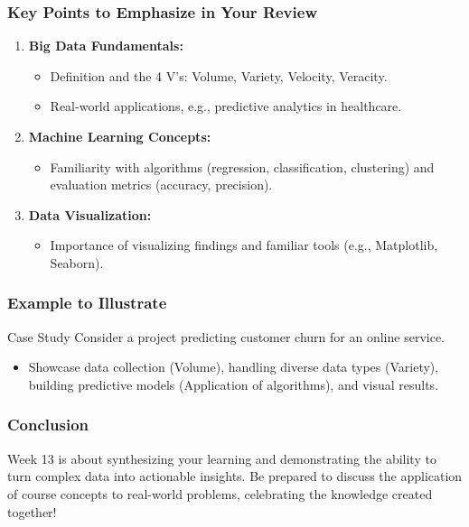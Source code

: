 \documentclass[aspectratio=169]{beamer}
\begin{document}
\begin{frame}[fragile]
    \frametitle{Key Points to Emphasize in Your Review}
    \begin{enumerate}
        \item \textbf{Big Data Fundamentals:}
            \begin{itemize}
                \item Definition and the 4 V's: Volume, Variety, Velocity, Veracity.
                \item Real-world applications, e.g., predictive analytics in healthcare.
            \end{itemize}
        \item \textbf{Machine Learning Concepts:}
            \begin{itemize}
                \item Familiarity with algorithms (regression, classification, clustering) and evaluation metrics (accuracy, precision).
            \end{itemize}
        \item \textbf{Data Visualization:}
            \begin{itemize}
                \item Importance of visualizing findings and familiar tools (e.g., Matplotlib, Seaborn).
            \end{itemize}
    \end{enumerate}
\end{frame}

\begin{frame}[fragile]
    \frametitle{Example to Illustrate}
    \begin{block}{Case Study}
        Consider a project predicting customer churn for an online service. 
        \begin{itemize}
            \item Showcase data collection (Volume), handling diverse data types (Variety), building predictive models (Application of algorithms), and visual results.
        \end{itemize}
    \end{block}
\end{frame}

\begin{frame}[fragile]
    \frametitle{Conclusion}
    Week 13 is about synthesizing your learning and demonstrating the ability to turn complex data into actionable insights. Be prepared to discuss the application of course concepts to real-world problems, celebrating the knowledge created together!
\end{frame}
\end{document}
